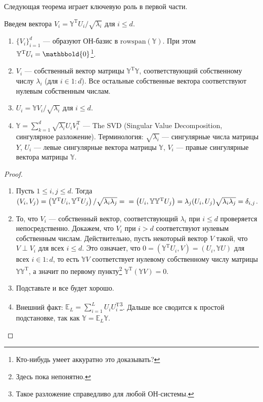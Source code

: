 Следующая теорема играет ключевую роль в первой части.
\begin{thm}
    Введем вектора $V_i = \mathbb Y^\mathrm T U_i / \sqrt{\lambda_i}$ для $i \leqslant d$. 
    \begin{enumerate}
        \item $\{V_i\}_{i = 1}^d$ --- образуют ОН-базис в $\mathrm{rowspan}(\mathbb Y)$. При этом $\mathbb Y^\mathrm T U_i = \mathbbold{0}$\footnote{\color{blue} Кто-нибудь умеет аккуратно это доказывать?}.
        \item $V_i$ --- собственный вектор матрицы $\mathbb Y^\mathrm T \mathbb Y$, соответствующий собственному числу $\lambda_i$ (для $i \in 1:d$).
              Все остальные собственные вектора соответствуют нулевым собственным числам.
        \item $U_i = \mathbb Y V_i / \sqrt{\lambda_i}$ для $i \leqslant d$.
        \item $\mathbb Y = \sum_{k = 1}^d \sqrt{\lambda_i} U_i V_i^\mathrm T$ --- The SVD (Singular Value Decomposition, сингулярное разложение). Терминология: $\sqrt{\lambda_i}$ --- сингулярные числа матрицы $Y$,
              $U_i$ --- левые сингулярные вектора матрицы $\mathbb Y$, $V_i$ --- правые сингулярные вектора матрицы $\mathbb Y$.
    \end{enumerate}
\end{thm}

\begin{proof}
    \begin{enumerate}
        \item Пусть $1 \leqslant i, j \leqslant d$. Тогда $(V_i, V_j) = \left(\mathbb Y^\mathrm T U_i, \mathbb Y^\mathrm T U_j\right) / \sqrt{\lambda_i \lambda_j}= \\ =
              \left(U_i, \mathbb Y \mathbb Y^\mathrm T U_j\right) = \lambda_j (U_i, U_j) \sqrt{\lambda_i \lambda_j} = \delta_{i,j}$.
        \item То, что $V_i$ --- собственный вектор, соответствующий $\lambda_i$ при $i \leqslant d$ проверяется непосредственно. Докажем, что
              $V_i$ при $i > d$ соответствуют нулевым собственным числам. Действительно, пусть некоторый вектор $V$ такой, что $V \perp V_i$ для всех $i \leqslant d$.
              Это означает, что $0 = (\mathbb Y^\mathrm T U_i, V) = (U_i, \mathbb Y U)$ для всех $i \in 1:d$, то есть $\mathbb Y V$ соответствует нулевому собственному числу матрицы $\mathbb Y \mathbb Y^\mathrm T$,
              а значит по первому пункту\footnote{\color{blue} Здесь пока непонятно.}
              $\mathbb Y^\mathrm T (\mathbb Y V) =0$.
        \item Подставьте и все будет хорошо.
        \item Внешний факт: $\mathbb E_{L} = \sum_{i=1}^L U_i U_i^\mathrm T$\footnote{Такое разложение справедливо для любой ОН-системы.}.
              Дальше все сводится к простой подстановке, так как $\mathbb Y = \mathbb E_L \mathbb Y$.
    \end{enumerate}          
\end{proof}

